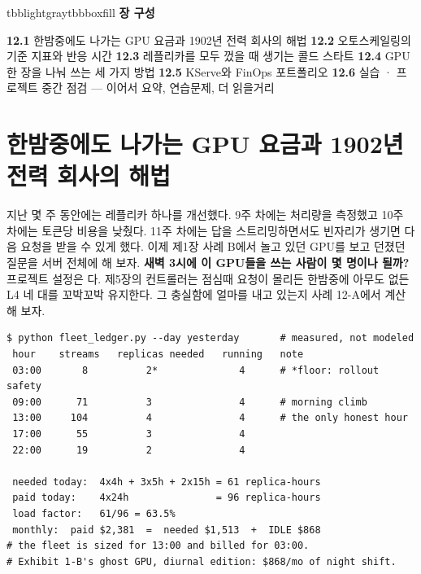 \vspace{2.5pt}

\begin{calloutbox}{tbblightgray}{tbbboxfill}
{\normalsize\bfseries\color{tbbink}장 구성}\par\vspace{3pt}
\textbf{12.1} 한밤중에도 나가는 GPU 요금과 1902년 전력 회사의 해법    \textbf{12.2} 오토스케일링의 기준 지표와 반응 시간    \textbf{12.3} 레플리카를 모두 껐을 때 생기는 콜드 스타트    \textbf{12.4} GPU 한 장을 나눠 쓰는 세 가지 방법    \textbf{12.5} KServe와 FinOps 포트폴리오    \textbf{12.6} 실습 · 프로젝트 중간 점검 — 이어서 요약, 연습문제, 더 읽을거리
\end{calloutbox}

\section{한밤중에도 나가는 GPU 요금과 1902년 전력 회사의 해법}

지난 몇 주 동안에는 레플리카 하나를 개선했다. 9주 차에는 처리량을 측정했고 10주 차에는 토큰당 비용을 낮췄다. 11주 차에는 답을 스트리밍하면서도 빈자리가 생기면 다음 요청을 받을 수 있게 했다. 이제 제1장 사례 B에서 놀고 있던 GPU를 보고 던졌던 질문을 서버 전체에 해 보자. \textbf{새벽 3시에 이 GPU들을 쓰는 사람이 몇 명이나 될까?} 프로젝트 설정은 다. 제5장의 컨트롤러는 점심때 요청이 몰리든 한밤중에 아무도 없든 L4 네 대를 꼬박꼬박 유지한다. 그 충실함에 얼마를 내고 있는지 사례 12-A에서 계산해 보자.

\begin{terminalbox}
\begin{Verbatim}[breaklines=true,breakanywhere=true,fontsize=\small,formatcom=\color{tbbtermfg},codes=\tbbcodeactive]
$ python fleet_ledger.py --day yesterday       # measured, not modeled
 hour    streams   replicas needed   running   note
 03:00       8          2*              4      # *floor: rollout safety
 09:00      71          3               4      # morning climb
 13:00     104          4               4      # the only honest hour
 17:00      55          3               4
 22:00      19          2               4

 needed today:  4x4h + 3x5h + 2x15h = 61 replica-hours
 paid today:    4x24h               = 96 replica-hours
 load factor:   61/96 = 63.5%
 monthly:  paid $2,381  =  needed $1,513  +  IDLE $868
# the fleet is sized for 13:00 and billed for 03:00.
# Exhibit 1-B's ghost GPU, diurnal edition: $868/mo of night shift.
\end{Verbatim}
\end{terminalbox}

